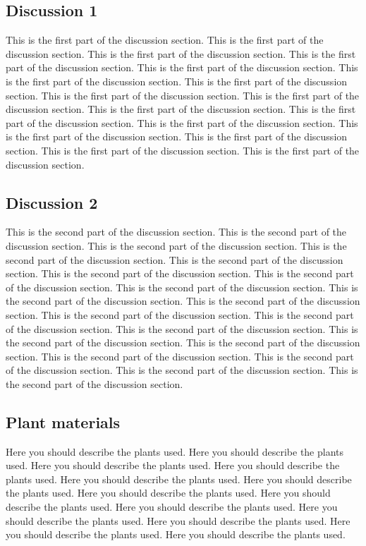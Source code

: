 \documentclass{pnastwo}
\begin{document}
\begin{article}
\subsection{Discussion 1}
This is the first part of the discussion section. This is the first
part of the discussion section. This is the first part of the
discussion section. This is the first part of the discussion
section. This is the first part of the discussion section. This is the
first part of the discussion section. This is the first part of the
discussion section. This is the first part of the discussion
section. This is the first part of the discussion section. This is the
first part of the discussion section. This is the first part of the
discussion section. This is the first part of the discussion
section. This is the first part of the discussion section. This is the
first part of the discussion section. This is the first part of the
discussion section. This is the first part of the discussion section. 

\subsection{Discussion 2}
This is the second part of the discussion section. This is the second
part of the discussion section. This is the second part of the
discussion section. This is the second part of the discussion
section. This is the second part of the discussion section. This is
the second part of the discussion section. This is the second part of
the discussion section. This is the second part of the discussion
section. This is the second part of the discussion section. This is
the second part of the discussion section. This is the second part of
the discussion section. This is the second part of the discussion
section. This is the second part of the discussion section. This is
the second part of the discussion section. This is the second part of
the discussion section. This is the second part of the discussion
section. This is the second part of the discussion section. This is
the second part of the discussion section. This is the second part of
the discussion section. 

\begin{materials}
\subsection{Plant materials}
Here you should describe the plants used. Here you should describe the plants used. Here you should describe the plants used. Here you should describe the plants used. Here you should describe the plants used. Here you should describe the plants used. Here you should describe the plants used. Here you should describe the plants used. Here you should describe the plants used. Here you should describe the plants used. Here you should describe the plants used. Here you should describe the plants used. Here you should describe the plants used. 


\end{materials}
\end{article}
\end{document}
